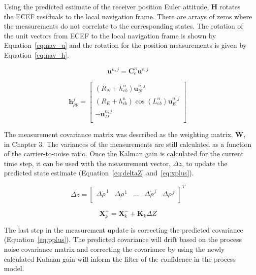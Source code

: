 Using the predicted estimate of the receiver position Euler attitude, \(\mathbf{H}\) rotates the ECEF residuals to the local navigation frame. There are arrays of zeros where the measurements do not correlate to the corresponding states. The rotation of the unit vectors from ECEF to the local navigation frame is shown by Equation~\ref{eq:nav_u} and the rotation for the position measurements is given by Equation~\ref{eq:nav_h}.

\begin{equation}\label{eq:nav_u}
    \mathbf{u}^{n,j} = \mathbf{C}_e^n \mathbf{u}^{e,j}
\end{equation}

\begin{equation}\label{eq:nav_h}
    \mathbf{h}^j_{\rho p} =
    \begin{bmatrix}
        \left(R_N + h^n_{eb}\right)\mathbf{u}^{n,j}_N               \\
        \left(R_E + h_{eb}^n\right)\cos(L^n_{eb})\mathbf{u}^{n,j}_E \\
        -\mathbf{u}^{n,j}_D                                         \\
    \end{bmatrix}
\end{equation}

The measurement covariance matrix was described as the weighting matrix, \(\mathbf{W}\), in Chapter 3. The variances of the measurements are still calculated as a function of the carrier-to-noise ratio. Once the Kalman gain is calculated for the current time step, it can be used with the measurement vector, \(\Delta z\), to update the predicted state estimate (Equation~\ref{eq:deltaZ} and~\ref{eq:xplus}).

\begin{equation}\label{eq:deltaZ}
    \Delta z = \begin{bmatrix}
        \Delta\dot{\rho}^{\,1} & \Delta{\rho}^{\,1} & \hdots & \Delta\dot{\rho}^{\,j} & \Delta{\rho}^{\,j} \\
    \end{bmatrix}^T
\end{equation}

\begin{equation}\label{eq:xplus}
    \mathbf{X}_k^+ = \mathbf{X}^-_k + \mathbf{K}_k\Delta Z
\end{equation}

The last step in the measurement update is correcting the predicted covariance (Equation~\ref{eq:pplus}). The predicted covariance will drift based on the process noise covariance matrix and correcting the covariance by using the newly calculated Kalman gain will inform the filter of the confidence in the process model.


